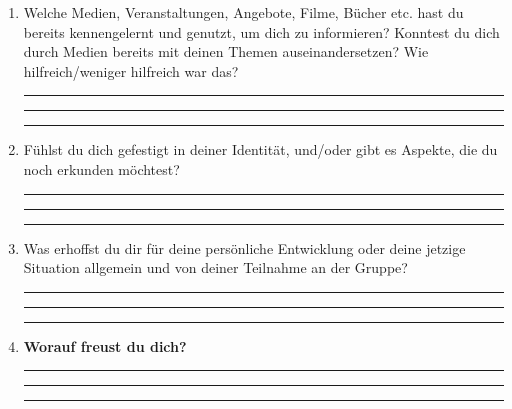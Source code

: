 \documentclass[a4paper,12pt]{article}
\begin{document}
\begin{enumerate}[label=--]
    \item Welche Medien, Veranstaltungen, Angebote, Filme, Bücher etc. hast du bereits kennengelernt und genutzt, um dich zu informieren? 
    Konntest du dich durch Medien bereits mit deinen Themen auseinandersetzen? Wie hilfreich/weniger hilfreich war das?  
    
    \rule{12cm}{0.2pt}

    \rule{12cm}{0.2pt}
    
    \rule{12cm}{0.2pt}
    
    \item Fühlst du dich gefestigt in deiner Identität, und/oder gibt es Aspekte, die du noch erkunden möchtest?  
    
    \rule{12cm}{0.2pt}
    
    \rule{12cm}{0.2pt}
    
    \rule{12cm}{0.2pt}
    
    \item Was erhoffst du dir für deine persönliche Entwicklung oder deine jetzige Situation allgemein und von deiner Teilnahme an der Gruppe?  
   
    \rule{12cm}{0.2pt}
    
    \rule{12cm}{0.2pt}
    
    \rule{12cm}{0.2pt}
    
    \item \textbf{Worauf freust du dich?}  
   
    \rule{12cm}{0.2pt}

    \rule{12cm}{0.2pt}
    
    \rule{12cm}{0.2pt}
\end{enumerate}
\end{document}
